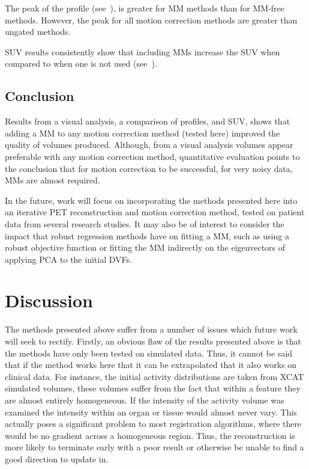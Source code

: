             The peak of the profile (see~), is greater for \gls{MM} methods than for \gls{MM}-free methods. However, the peak for all motion correction methods are greater than ungated methods.
             
            \gls{SUV} results consistently show that including \glspl{MM} increase the \gls{SUV} when compared to when one is not used (see~).
        
        \subsection{Conclusion} \label{sec:comparison_of_motion_correction_methods_incorporating_motion_modelling_for_pet_ct_using_a_single_breath_hold_attenuation_map_conclusions}
            Results from a visual analysis, a comparison of profiles, and \gls{SUV}, shows that adding a \gls{MM} to any motion correction method (tested here) improved the quality of volumes produced. Although, from a visual analysis volumes appear preferable with any motion correction method, quantitative evaluation points to the conclusion that for motion correction to be successful, for very noisy data, \glspl{MM} are almost required.
            
            In the future, work will focus on incorporating the methods presented here into an iterative \gls{PET} reconstruction and motion correction method, tested on patient data from several research studies. It may also be of interest to consider the impact that robust regression methods have on fitting a \gls{MM}, such as using a robust objective function or fitting the \gls{MM} indirectly on the eigenvectors of applying \gls{PCA} to the initial \glspl{DVF}.
    
    \section{Discussion} \label{sec:initial_motion_correction_using_basic_reconstruction_and_gating_methods_with_less_challenging_data_discussion}
        The methods presented above suffer from a number of issues which future work will seek to rectify. Firstly, an obvious flaw of the results presented above is that the methods have only been tested on simulated data. Thus, it cannot be said that if the method works here that it can be extrapolated that it also works on clinical data. For instance, the initial activity distributions are taken from \gls{XCAT} simulated volumes, these volumes suffer from the fact that within a feature they are almost entirely homogeneous. If the intensity of the activity volume was examined the intensity within an organ or tissue would almost never vary. This actually poses a significant problem to most registration algorithms, where there would be no gradient across a homogeneous region. Thus, the reconstruction is more likely to terminate early with a poor result or otherwise be unable to find a good direction to update in.
        
